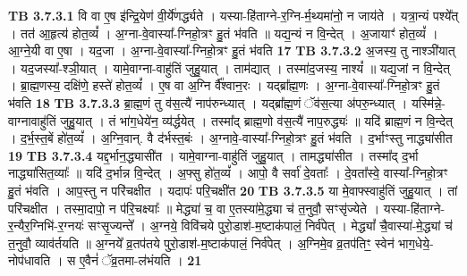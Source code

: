 \documentclass[17pt]{extarticle}
\begin{document}
{{{{{{{{{{{{{{{{{{{                                \textbf{ TB 3.7.3.1} \newline
                  वि वा ए॒ष इ॑न्द्रि॒येण॑ वी॒र्ये॑णर्द्ध्यते । यस्या-हि॑ताग्ने-र॒ग्नि-र्म॒थ्यमा॑नो॒ न जाय॑ते । यत्रा॒न्यं पश्ये᳚त् । तत॑ आ॒हृत्य॑ होत॒व्यं᳚ । अ॒ग्ना-वे॒वास्या᳚-ग्निहो॒त्रꣳ हु॒तं भ॑वति ॥ यद्य॒न्यं न वि॒न्देत् । अ॒जायाꣳ॑ होत॒व्यं᳚ । आ॒ग्ने॒यी वा ए॒षा । यद॒जा । अ॒ग्ना-वे॒वास्या᳚-ग्निहो॒त्रꣳ हु॒तं भ॑वति \textbf{ 17} \newline
                  \newline
                                \textbf{ TB 3.7.3.2} \newline
                  अ॒जस्य॒ तु नाश्ञी॑यात् । यद॒जस्या᳚-श्ञी॒यात् । यामे॒वाग्ना-वाहु॑तिं जुहु॒यात् । ताम॑द्यात् । तस्मा॑द॒जस्य॒ नाश्यं᳚ ॥ यद्य॒जां न वि॒न्देत् । ब्रा॒ह्म॒णस्य॒ दक्षि॑णे॒ हस्ते॑ होत॒व्यं᳚ । ए॒ष वा अ॒ग्नि र्वै᳚श्वान॒रः । यद्ब्रा᳚ह्म॒णः । अ॒ग्ना-वे॒वास्या᳚-ग्निहो॒त्रꣳ हु॒तं भ॑वति \textbf{ 18} \newline
                  \newline
                                \textbf{ TB 3.7.3.3} \newline
                  ब्रा॒ह्म॒णं तु व॑स॒त्यै॑ नाप॑रुन्ध्यात् । यद्ब्रा᳚ह्म॒णं ॅव॑स॒त्या अ॑परु॒न्ध्यात् । यस्मि॑न्ने॒-वाग्नावाहु॑तिं जुहु॒यात् । तं भा॑ग॒धेये॑न॒ व्य॑र्द्धयेत् । तस्मा᳚द् ब्राह्म॒णो व॑स॒त्यै॑ नाप॒रुद्ध्यः॑ ॥ यदि॑ ब्राह्म॒णं न वि॒न्देत् । द॒र्भ॒स्त॒बें हो॑त॒व्यं᳚ । अ॒ग्नि॒वान्. वै द॑र्भस्त॒बंः । अ॒ग्नावे॒-वास्या᳚-ग्निहो॒त्रꣳ हु॒तं भ॑वति । द॒र्भाꣳस्तु नाद्ध्या॑सीत \textbf{ 19} \newline
                  \newline
                                \textbf{ TB 3.7.3.4} \newline
                  यद्द॒र्भान॒द्ध्यासी॑त । यामे॒वाग्ना-वाहु॑तिं जुहु॒यात् । तामद्ध्या॑सीत । तस्मा᳚द् द॒र्भा नाद्ध्या॑सित॒व्याः᳚ ॥ यदि॑ द॒र्भान्न वि॒न्देत् । अ॒फ्सु हो॑त॒व्यं᳚ । आपो॒ वै सर्वा॑ दे॒वताः᳚ । दे॒वता᳚स्वे॒ वास्या᳚-ग्निहो॒त्रꣳ हु॒तं भ॑वति । आप॒स्तु न परि॑चक्षीत । यदापः॑ परि॒चक्षी॑त \textbf{ 20} \newline
                  \newline
                                \textbf{ TB 3.7.3.5} \newline
                  या मे॒वाफ्स्वाहु॑तिं जुहु॒यात् । तां परि॑चक्षीत । तस्मा॒दापो॒ न प॑रि॒चक्ष्याः᳚ ॥ मेद्ध्या॑ च॒ वा ए॒तस्या॑मे॒द्ध्या च॑ त॒नुवौ॒ सꣳसृ॑ज्येते । यस्या-हि॑ताग्ने-र॒न्यैर॒ग्निभि॑-र॒ग्नयः॑ सꣳसृ॒ज्यन्ते᳚ । अ॒ग्नये॒ विवि॑चये पुरो॒डाश॑-म॒ष्टाक॑पालं॒ निर्व॑पेत् । मेद्ध्यां᳚ चै॒वास्या॑-मे॒द्ध्यां च॑ त॒नुवौ॒ व्याव॑र्तयति ॥ अ॒ग्नये᳚ व्र॒तप॑तये पुरो॒डाश॑-म॒ष्टाक॑पालं॒ निर्व॑पेत् । अ॒ग्निमे॒व व्र॒तप॑तिꣳ॒॒ स्वेन॑ भाग॒धेये॒-नोप॑धावति । स ए॒वैनं॑ ॅव्र॒तमा-ल॑भंयति । \textbf{ 21} \newline
}}}}}}}}}}}}}}}}}}}
\end{document}
